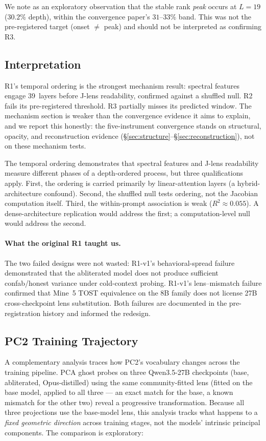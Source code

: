 \documentclass[11pt,a4paper]{article}
\begin{document}
We note as an exploratory observation that the stable rank \emph{peak}
occurs at $L{=}19$ ($30.2\%$ depth), within the convergence paper's
$31$--$33\%$ band. This was not the pre-registered target
(onset $\neq$ peak) and should not be interpreted as confirming R3.

\subsection{Interpretation}

R1's temporal ordering is the strongest mechanism result: spectral
features engage 39~layers before J-lens readability, confirmed
against a shuffled null. R2 fails its pre-registered threshold.
R3 partially misses its predicted window. The mechanism section
is weaker than the convergence evidence it aims to explain, and we
report this honestly: the five-instrument convergence stands on
structural, opacity, and reconstruction evidence
(\S\ref{sec:structure}--\S\ref{sec:reconstruction}), not on these
mechanism tests.

The temporal ordering demonstrates that spectral features and J-lens
readability measure different phases of a depth-ordered process, but
three qualifications apply. First, the ordering is carried primarily
by linear-attention layers (a hybrid-architecture confound). Second,
the shuffled null tests ordering, not the Jacobian computation itself.
Third, the within-prompt association is weak ($R^2 \approx 0.055$).
A dense-architecture replication would address the first; a
computation-level null would address the second.

\paragraph{What the original R1 taught us.} The two failed designs were
not wasted: R1-v1's behavioral-spread failure demonstrated that the
abliterated model does not produce sufficient confab/honest variance
under cold-context probing. R1-v1's lens--mismatch failure confirmed
that Mine~5 TOST equivalence on the 8B family does not license 27B
cross-checkpoint lens substitution. Both failures are documented in the
pre-registration history and informed the redesign.

\subsection{PC2 Training Trajectory}

A complementary analysis traces how PC2's vocabulary changes across
the training pipeline. PCA ghost probes on three Qwen3.5-27B
checkpoints (base, abliterated, Opus-distilled) using the same
community-fitted lens (fitted on the base model, applied to all three
--- an exact match for the base, a known mismatch for the other two)
reveal a progressive transformation. Because all three projections
use the base-model lens, this analysis tracks what happens to a
\emph{fixed geometric direction} across training stages, not the
models' intrinsic principal components. The comparison is exploratory:
\end{document}
